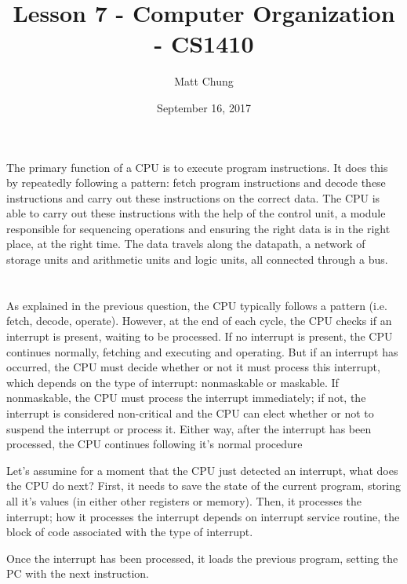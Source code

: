 \documentclass{article}
\title{Lesson 7 - Computer Organization - CS1410}
\author{Matt Chung}
\date{September 16, 2017}
\begin{document}
\maketitle

\section{}
The primary function of a CPU is to execute program instructions.  It does this by repeatedly following a pattern: fetch program instructions and decode these instructions and carry out these instructions on the correct data.  The CPU is able to carry out these instructions with the help of the control unit, a module responsible for sequencing operations and ensuring the right data is in the right place, at the right time.  The data travels along the datapath, a network of storage units and arithmetic units and logic units, all connected through a bus.

\section{}
As explained in the previous question, the CPU typically follows a pattern (i.e. fetch, decode, operate). However, at the end of each cycle, the CPU checks if an interrupt is present, waiting to be processed.  If no interrupt is present, the CPU continues normally, fetching and executing and operating. But if an interrupt has occurred, the CPU must decide whether or not it must process this interrupt, which depends on the type of interrupt: nonmaskable or maskable. If nonmaskable, the CPU must process the interrupt immediately; if not, the interrupt is considered non-critical and the CPU can elect whether or not to suspend the interrupt or process it.  Either way, after the interrupt has been processed, the CPU continues following it's normal procedure

Let's assumine for a moment that the CPU just detected an interrupt, what does the CPU do next? First, it needs to save the state of the current program, storing all it's values (in either other registers or memory). Then, it processes the interrupt; how it processes the interrupt depends on interrupt service routine, the block of code associated with the type of interrupt.

Once the interrupt has been processed, it loads the previous program, setting the PC with the next instruction.

\setcounter{section}{3}
\section{}
\end{document}
